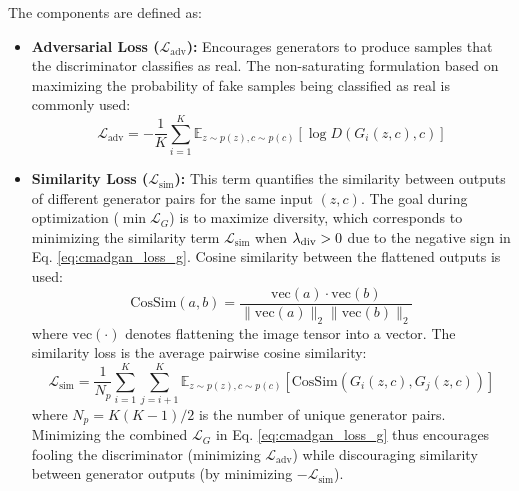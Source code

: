The components are defined as:
\begin{itemize}
    \item \textbf{Adversarial Loss (\( \mathcal{L}_{\text{adv}} \)):} Encourages generators to produce samples that the discriminator classifies as real. The non-saturating formulation based on maximizing the probability of fake samples being classified as real is commonly used:
    \begin{equation}
    \label{eq:cmadgan_loss_g_adv}
    \mathcal{L}_{\text{adv}} = - \frac{1}{K} \sum_{i=1}^{K} \mathbb{E}_{z \sim p(z), c \sim p(c)} [\log D(G_i(z, c), c)]
    \end{equation}

    \item \textbf{Similarity Loss (\( \mathcal{L}_{\text{sim}} \)):} This term quantifies the similarity between outputs of different generator pairs for the same input \( (z, c) \). The goal during optimization (\(\min \mathcal{L}_G\)) is to maximize diversity, which corresponds to minimizing the similarity term \( \mathcal{L}_{\text{sim}} \) when \( \lambda_{\text{div}} > 0 \) due to the negative sign in Eq. \ref{eq:cmadgan_loss_g}. Cosine similarity between the flattened outputs is used:
    \begin{equation}
    \label{eq:cmadgan_cossim}
    \text{CosSim}(a, b) = \frac{\text{vec}(a) \cdot \text{vec}(b)}{\|\text{vec}(a)\|_2 \|\text{vec}(b)\|_2}
    \end{equation}
    where \( \text{vec}(\cdot) \) denotes flattening the image tensor into a vector. The similarity loss is the average pairwise cosine similarity:
    \begin{equation}
    \label{eq:cmadgan_loss_g_sim}
    \mathcal{L}_{\text{sim}} = \frac{1}{N_p} \sum_{i=1}^{K} \sum_{j=i+1}^{K} \mathbb{E}_{z \sim p(z), c \sim p(c)} [\text{CosSim}(G_i(z, c), G_j(z, c))]
    \end{equation}
    where \( N_p = K(K-1)/2 \) is the number of unique generator pairs. Minimizing the combined \( \mathcal{L}_G \) in Eq. \ref{eq:cmadgan_loss_g} thus encourages fooling the discriminator (minimizing \( \mathcal{L}_{\text{adv}} \)) while discouraging similarity between generator outputs (by minimizing \( -\mathcal{L}_{\text{sim}} \)).
\end{itemize}


